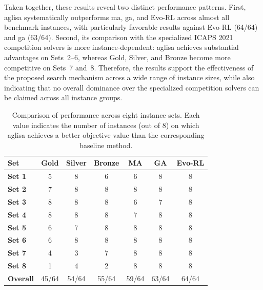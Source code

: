 \documentclass[pdflatex]{sn-jnl}
\begin{document}
Taken together, these results reveal two distinct performance patterns. First, \gls{aglisa} systematically outperforms \gls{ma}, \gls{ga}, and Evo-RL across almost all benchmark instances, with particularly favorable results against Evo-RL (64/64) and \gls{ga} (63/64). Second, its comparison with the specialized ICAPS 2021 competition solvers is more instance-dependent: \gls{aglisa} achieves substantial advantages on Sets~2--6, whereas Gold, Silver, and Bronze become more competitive on Sets~7 and~8. Therefore, the results support the effectiveness of the proposed search mechanism across a wide range of instance sizes, while also indicating that no overall dominance over the specialized competition solvers can be claimed across all instance groups.

\begin{table}[htp]
\centering
\caption{Comparison of performance across eight instance sets. 
Each value indicates the number of instances (out of 8) on which 
\gls{aglisa} achieves a better objective value than the corresponding baseline method.}
\label{tab:summary}

\begin{tabular}{|l|c|c|c|c|c|c|}
\hline
\textbf{Set} 
& \textbf{Gold} 
& \textbf{Silver} 
& \textbf{Bronze} 
& \textbf{MA} 
& \textbf{GA} 
& \textbf{Evo-RL} \\ 
\hline

\textbf{Set 1} 
& 5 & 8 & 6 & 6 & 8 & 8 \\ 
\hline

\textbf{Set 2} 
& 7 & 8 & 8 & 8 & 8 & 8 \\ 
\hline

\textbf{Set 3} 
& 8 & 8 & 8 & 6 & 7 & 8 \\ 
\hline

\textbf{Set 4} 
& 8 & 8 & 8 & 7 & 8 & 8 \\ 
\hline

\textbf{Set 5} 
& 6 & 7 & 8 & 8 & 8 & 8 \\ 
\hline

\textbf{Set 6} 
& 6 & 8 & 8 & 8 & 8 & 8 \\ 
\hline

\textbf{Set 7} 
& 4 & 3 & 7 & 8 & 8 & 8 \\ 
\hline

\textbf{Set 8} 
& 1 & 4 & 2 & 8 & 8 & 8 \\ 
\hline

\textbf{Overall}
& 45/64 & 54/64 & 55/64 & 59/64 & 63/64 & 64/64 \\
\hline

\end{tabular}
\end{table}
\end{document}
